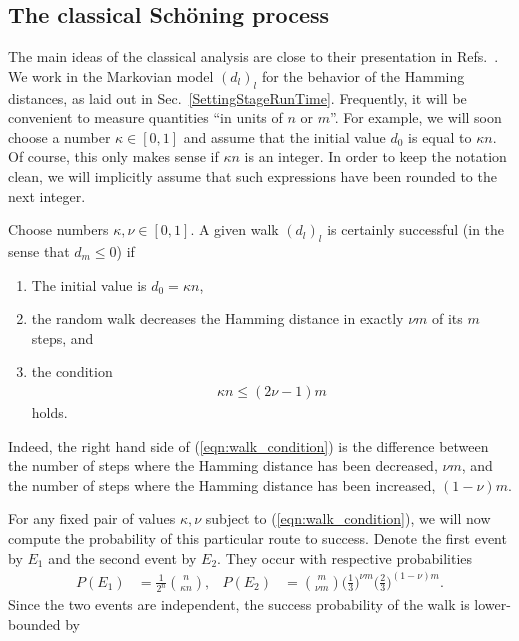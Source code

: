 \documentclass[a4paper,aps,floatfix]{revtex4}
\begin{document}
\subsection{The classical Sch\"oning process}
\label{sec:analysis_classical}


The main ideas of the classical analysis are close to their presentation in Refs.~\cite{Schoening99,SchoeningToranBook}.
We work in the Markovian model $(d_l)_l$ for the behavior of the Hamming distances, as laid out in Sec.~\ref{SettingStageRunTime}.
Frequently, it will be convenient to measure quantities ``in units of $n$ or $m$''. For example, we will soon choose a number $\kappa\in[0,1]$ and assume that the initial value $d_0$ is equal to $\kappa n$. 
Of course, this only makes sense if $\kappa n$ is an integer.
In order to keep the notation clean, we will implicitly assume that such expressions have been rounded to the next integer.


Choose numbers $\kappa, \nu \in[0,1]$.
A given walk $(d_l)_l$ is certainly successful (in the sense that $d_m\leq 0$) if 
\begin{enumerate}
	\item
		The initial value is $d_0=\kappa n$,
	\item
    the random walk decreases the Hamming distance in exactly $\nu m$ of its $m$ steps, and
	\item
		the condition
		\begin{align}\label{eqn:walk_condition}
			\kappa n \leq (2\nu -1)m 
		\end{align}
		holds.
\end{enumerate}
Indeed, the right hand side of (\ref{eqn:walk_condition}) is the difference between the number of steps where the Hamming distance has been decreased, $\nu m$, and the number of steps where the Hamming distance has been increased, $(1-\nu )m$. 

For any fixed pair of values $\kappa,\nu$ subject to (\ref{eqn:walk_condition}), we will now compute the probability of this particular route to success.
Denote the first event by $E_1$ and the second event by $E_2$.
They occur with respective probabilities
\begin{align}\label{eqn:events_probs}
    P(E_1) &= \frac{1}{2^n}\binom{n}{\kappa n},
					 &
    P(E_2) &= \binom{m}{\nu m}\Big(\frac13\Big)^{\nu m}\Big(\frac23\Big)^{(1-\nu)m}.
\end{align}
Since the two events are independent, 
the success probability of the walk 
is lower-bounded by 
\end{document}
